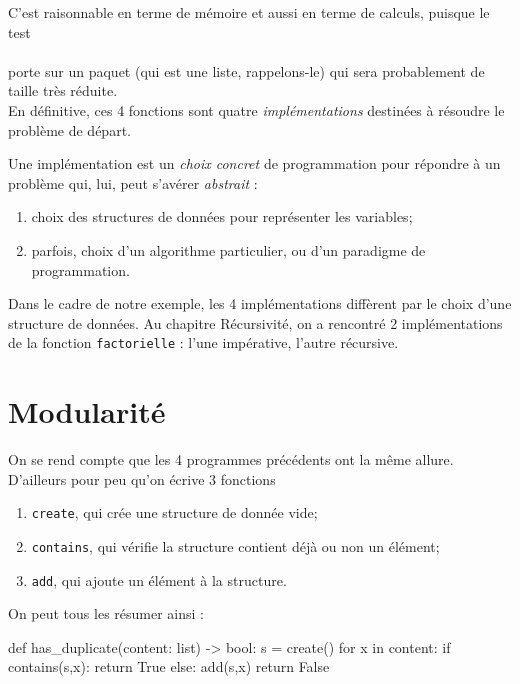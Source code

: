\documentclass[a4paper,12pt,french]{book}
\begin{document}
C'est raisonnable en terme de mémoire et aussi en terme de calculs, puisque le test\\ \\
porte sur un paquet (qui est une liste, rappelons-le) qui sera probablement de taille très réduite.\\

En définitive, ces 4 fonctions sont quatre \textit{implémentations} destinées à résoudre le problème de départ.

\begin{definition}[ : implémentation]
	Une implémentation est un \textit{choix concret} de programmation pour répondre à un problème qui, lui, peut s'avérer \textit{abstrait} :
	\begin{enumerate}[--]
		\item 	choix des structures de données pour représenter les variables;
		\item 	parfois, choix d'un algorithme particulier, ou d'un paradigme de programmation.
	\end{enumerate}
\end{definition}

Dans le cadre de notre exemple, les 4 implémentations diffèrent par le choix d'une structure de données. Au chapitre \og Récursivité\fg{}, on a rencontré 2 implémentations de la fonction \texttt{factorielle} : l'une impérative, l'autre récursive.


\section{Modularité}

On se rend compte que les 4 programmes précédents ont la même allure. D'ailleurs pour peu qu'on écrive 3 fonctions
\begin{enumerate}[--]
	\item 	\texttt{create}, qui crée une structure de donnée vide;
	\item 	\texttt{contains}, qui vérifie la structure contient déjà ou non un élément;
	\item	\texttt{add}, qui ajoute un élément à la structure.

\end{enumerate}
On peut tous les résumer ainsi :

\begin{pythoncode}
def has_duplicate(content: list) -> bool:
    s = create()
    for x in content:
        if contains(s,x):
            return True
        else:
            add(s,x)
    return False
\end{pythoncode}
\end{document}
